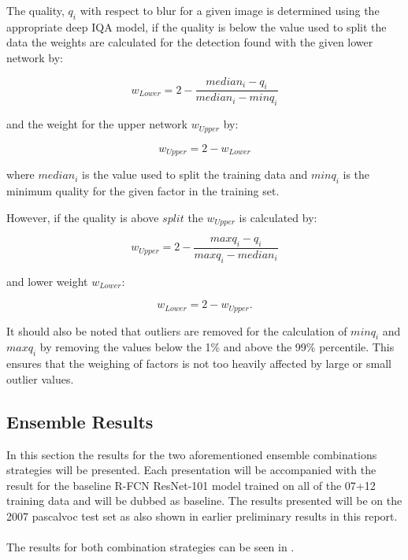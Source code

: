 The quality, $q_i$ with respect to blur for a given image is determined using the appropriate deep IQA model, if the quality is below the value used to split the data the weights are calculated for the detection found with the given lower network by:

\begin{equation}
	w_{Lower} = 2 - \frac{median_i - q_i}{median_i - minq_i}
\end{equation}

and the weight for the upper network $w_{Upper}$ by:

\begin{equation}
	w_{Upper} = 2 - w_{Lower}
\end{equation}

where $median_i$ is the value used to split the training data and $minq_i$ is the minimum quality for the given factor in the training set.

However, if the quality is above $split$ the $w_{Upper}$ is calculated by:

\begin{equation}
	w_{Upper} = 2 - \frac{maxq_i - q_i}{maxq_i - median_i}
\end{equation}

and lower weight $w_{Lower}$:

\begin{equation}
	w_{Lower} = 2 - w_{Upper}.
\end{equation}

It should also be noted that outliers are removed for the calculation of $minq_i$ and $maxq_i$ by removing the values below the 1\% and above the 99\% percentile. This ensures that the weighing of factors is not too heavily affected by large or small outlier values.

\subsection{Ensemble Results}
In this section the results for the two aforementioned ensemble combinations strategies will be presented. Each presentation will be accompanied with the result for the baseline R-FCN ResNet-101 model trained on all of the 07+12 training data and will be dubbed as baseline. The results presented will be on the 2007 \gls{pascalvoc} test set as also shown in earlier preliminary results in this report.
\\\\
The results for both combination strategies can be seen in .

